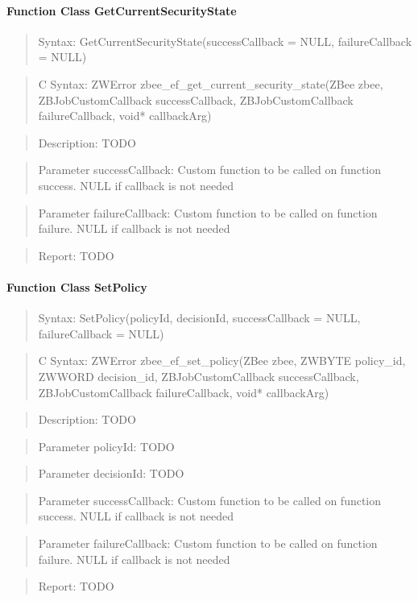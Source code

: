 \paragraph{Function Class GetCurrentSecurityState}
\begin{quote}Syntax: GetCurrentSecurityState(successCallback = NULL, failureCallback = NULL)\end{quote}
\begin{quote}C Syntax: ZWError zbee\_ef\_get\_current\_security\_state(ZBee zbee, ZBJobCustomCallback successCallback, ZBJobCustomCallback failureCallback, void* callbackArg)\end{quote}
\begin{quote}Description: TODO\end{quote}
\begin{quote}Parameter successCallback: Custom function to be called on function success. NULL if callback is not needed\end{quote}
\begin{quote}Parameter failureCallback: Custom function to be called on function failure. NULL if callback is not needed\end{quote}
\begin{quote}Report: TODO\end{quote}

\paragraph{Function Class SetPolicy}
\begin{quote}Syntax: SetPolicy(policyId, decisionId, successCallback = NULL, failureCallback = NULL)\end{quote}
\begin{quote}C Syntax: ZWError zbee\_ef\_set\_policy(ZBee zbee, ZWBYTE policy\_id, ZWWORD decision\_id, ZBJobCustomCallback successCallback, ZBJobCustomCallback failureCallback, void* callbackArg)\end{quote}
\begin{quote}Description: TODO\end{quote}
\begin{quote}Parameter policyId: TODO\end{quote}
\begin{quote}Parameter decisionId: TODO\end{quote}
\begin{quote}Parameter successCallback: Custom function to be called on function success. NULL if callback is not needed\end{quote}
\begin{quote}Parameter failureCallback: Custom function to be called on function failure. NULL if callback is not needed\end{quote}
\begin{quote}Report: TODO\end{quote}

